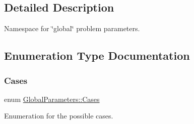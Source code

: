 \subsection{Detailed Description}
Namespace for \char`\"{}global\char`\"{} problem parameters. 

\subsection{Enumeration Type Documentation}
\mbox{\label{namespaceGlobalParameters_adde04e4243b82e3d4bd2f82d37a2d6bf}} 
\subsubsection{\texorpdfstring{Cases}{Cases}}
{\footnotesize\ttfamily enum \hyperlink{namespaceGlobalParameters_adde04e4243b82e3d4bd2f82d37a2d6bf}{Global\+Parameters\+::\+Cases}}



Enumeration for the possible cases. 

